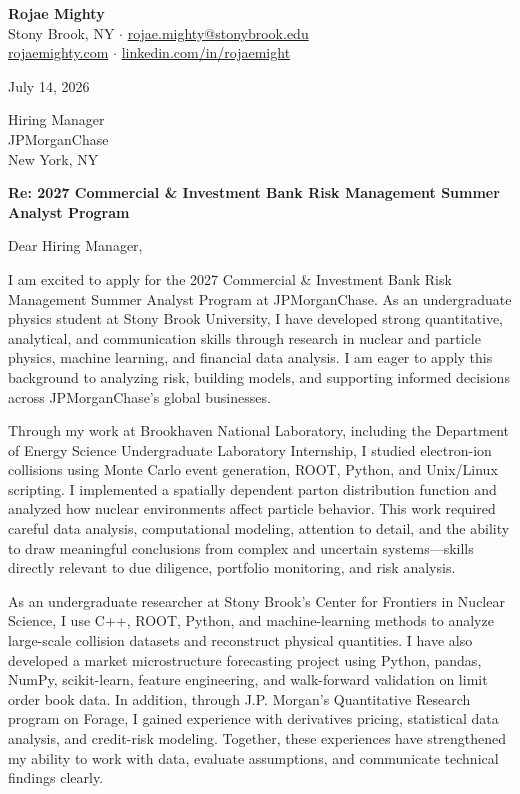 \documentclass[10pt,letterpaper]{article}
\begin{document}
\textbf{Rojae Mighty}\\
Stony Brook, NY \quad$\cdot$\quad
\href{mailto:rojae.mighty@stonybrook.edu}{rojae.mighty@stonybrook.edu}\\
\href{https://rojaemighty.com}{rojaemighty.com} \quad$\cdot$\quad
\href{https://www.linkedin.com/in/rojaemight/}{linkedin.com/in/rojaemight}

\vspace{8pt}
July 14, 2026

\vspace{8pt}
Hiring Manager\\
JPMorganChase\\
New York, NY

\vspace{8pt}
\textbf{Re: 2027 Commercial \& Investment Bank Risk Management Summer Analyst Program}

\vspace{4pt}
Dear Hiring Manager,

I am excited to apply for the 2027 Commercial \& Investment Bank Risk Management Summer Analyst Program at JPMorganChase. As an undergraduate physics student at Stony Brook University, I have developed strong quantitative, analytical, and communication skills through research in nuclear and particle physics, machine learning, and financial data analysis. I am eager to apply this background to analyzing risk, building models, and supporting informed decisions across JPMorganChase's global businesses.

Through my work at Brookhaven National Laboratory, including the Department of Energy Science Undergraduate Laboratory Internship, I studied electron-ion collisions using Monte Carlo event generation, ROOT, Python, and Unix/Linux scripting. I implemented a spatially dependent parton distribution function and analyzed how nuclear environments affect particle behavior. This work required careful data analysis, computational modeling, attention to detail, and the ability to draw meaningful conclusions from complex and uncertain systems---skills directly relevant to due diligence, portfolio monitoring, and risk analysis.

As an undergraduate researcher at Stony Brook's Center for Frontiers in Nuclear Science, I use C++, ROOT, Python, and machine-learning methods to analyze large-scale collision datasets and reconstruct physical quantities. I have also developed a market microstructure forecasting project using Python, pandas, NumPy, scikit-learn, feature engineering, and walk-forward validation on limit order book data. In addition, through J.P. Morgan's Quantitative Research program on Forage, I gained experience with derivatives pricing, statistical data analysis, and credit-risk modeling. Together, these experiences have strengthened my ability to work with data, evaluate assumptions, and communicate technical findings clearly.
\end{document}

